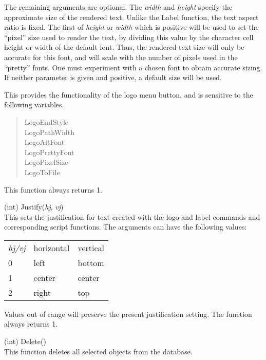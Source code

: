 \begin{description}
The remaining arguments are optional.  The {\it width} and {\it
height} specify the approximate size of the rendered text.  Unlike the
{\vt Label} function, the text aspect ratio is fixed.  The first of
{\it height} or {\it width} which is positive will be used to set the
``pixel'' size used to render the text, by dividing this value by the
character cell height or width of the default font.  Thus, the
rendered text size will only be accurate for this font, and will scale
with the number of pixels used in the ``pretty'' fonts.  One must
experiment with a chosen font to obtain accurate sizing.  If neither
parameter is given and positive, a default size will be used.

This provides the functionality of the {\cb logo} menu button, and is
sensitive to the following variables.

\begin{quote}\et
 LogoEndStyle\\
 LogoPathWidth\\
 LogoAltFont\\
 LogoPrettyFont\\
 LogoPixelSize\\
 LogoToFile
\end{quote}

This function always returns 1.

\item{(int) \vt Justify({\it hj\/}, {\it vj\/})}\\
This sets the justification for text created with the {\cb logo} and
{\cb label} commands and corresponding script functions.  The
arguments can have the following values:

\begin{tabular}{lll}
\it hj/vj & horizontal & vertical\\
0 & left & bottom\\
1 & center & center\\
2 & right & top\\
\end{tabular}

Values out of range will preserve the present justification setting.
The function always returns 1.

\item{(int) \vt Delete()}\\
This function deletes all selected objects from the database.


\end{description}
